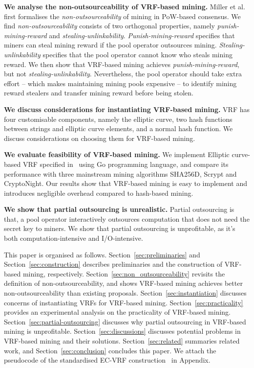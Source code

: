 \textbf{We analyse the non-outsourceability of VRF-based mining.}
Miller et al.~\cite{miller2015nonoutsourceable} first formalises the \emph{non-outsourceability} of mining in PoW-based consensus.
We find \emph{non-outsourceability} consists of two orthogonal properties, namely \emph{punish-mining-reward} and \emph{stealing-unlinkability}.
\emph{Punish-mining-reward} specifies that miners can steal mining reward if the pool operator outsources mining.
\emph{Stealing-unlinkability} specifies that the pool operator cannot know who steals mining reward.
We then show that VRF-based mining achieves \emph{punish-mining-reward}, but not \emph{stealing-unlinkability}.
Nevertheless, the pool operator should take extra effort -- which makes maintaining mining pools expensive -- to identify mining reward stealers and transfer mining reward before being stolen.

\textbf{We discuss considerations for instantiating VRF-based mining.}
VRF has four customisable components, namely the elliptic curve, two hash functions between strings and elliptic curve elements, and a normal hash function.
We discuss considerations on choosing them for VRF-based mining.

\textbf{We evaluate feasibility of VRF-based mining.}
We implement Elliptic curve-based VRF specified in~\cite{goldberg2017draft} using Go programming language, and compare its performance with three mainstream mining algorithms SHA256D, Scrypt and CryptoNight.
Our results show that VRF-based mining is easy to implement and introduces negligible overhead compared to hash-based mining.

\textbf{We show that partial outsourcing is unrealistic.}
Partial outsourcing is that, a pool operator interactively outsources computation that does not need the secret key to miners.
We show that partial outsourcing is unprofitable, as it's both computation-intensive and I/O-intensive.

This paper is organised as follows.
Section~\ref{sec:preliminaries} and Section~\ref{sec:construction} describes preliminaries and the construction of VRF-based mining, respectively.
Section~\ref{sec:non_outsourceability} revisits the definition of non-outsourceability, and shows VRF-based mining achieves better non-outsourceability than existing proposals.
Section~\ref{sec:instantiation} discusses concerns of instantiating VRFs for VRF-based mining.
Section~\ref{sec:practicality} provides an experimental analysis on the practicality of VRF-based mining.
Section~\ref{sec:partial-outsourcing} discusses why partial outsourcing in VRF-based mining is unprofitable.
Section~\ref{sec:discussions} discusses potential problems in VRF-based mining and their solutions.
Section~\ref{sec:related} summaries related work, and Section~\ref{sec:conclusion} concludes this paper.
We attach the pseudocode of the standardised EC-VRF construction~\cite{goldberg2017draft} in Appendix.
